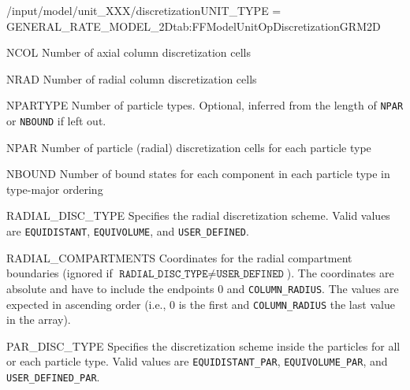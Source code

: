 \begin{condsubgroup}{/input/model/unit\_XXX/discretization}{UNIT\_TYPE = GENERAL\_RATE\_MODEL\_2D}{tab:FFModelUnitOpDiscretizationGRM2D}
  \begin{dataset}[type=int,range={$\geq 1$},length=1]{NCOL}
    Number of axial column discretization cells
  \end{dataset}
  \begin{dataset}[type=int,range={$\geq 1$},length=1]{NRAD}
    Number of radial column discretization cells
  \end{dataset}
  \begin{dataset}[type=int,range={$\geq 1$},length=1]{NPARTYPE}
    Number of particle types.
    Optional, inferred from the length of \texttt{NPAR} or \texttt{NBOUND} if left out.
  \end{dataset}
  \begin{dataset}[type=int,range={$\geq 1$},length={$1$ / \texttt{NPARTYPE}}]{NPAR}
    Number of particle (radial) discretization cells for each particle type
  \end{dataset}
  \begin{dataset}[type=int,range={$\geq 0$},length={\texttt{NCOMP} / $\texttt{NPARTYPE} \cdot \texttt{NCOMP}$}]{NBOUND}
    Number of bound states for each component in each particle type in type-major ordering
  \end{dataset}
  \begin{dataset}[type=string,length=1]{RADIAL\_DISC\_TYPE}
    Specifies the radial discretization scheme.
    Valid values are \texttt{EQUIDISTANT}, \texttt{EQUIVOLUME}, and \texttt{USER\_DEFINED}.
  \end{dataset}
  \begin{dataset}[unit=\si{\metre},type=double,range={$[0,\texttt{COLUMN\_RADIUS}]$},length={$\texttt{NRAD} + 1$}]{RADIAL\_COMPARTMENTS}
    Coordinates for the radial compartment boundaries (ignored if $\texttt{RADIAL\_DISC\_TYPE} \neq \texttt{USER\_DEFINED}$).
    The coordinates are absolute and have to include the endpoints $0$ and \texttt{COLUMN\_RADIUS}.
    The values are expected in ascending order (i.e., $0$ is the first and \texttt{COLUMN\_RADIUS} the last value in the array).
  \end{dataset}
  \begin{dataset}[type=string,length={$1$ / \texttt{NPARTYPE}}]{PAR\_DISC\_TYPE}
    Specifies the discretization scheme inside the particles for all or each particle type.
    Valid values are \texttt{EQUIDISTANT\_PAR}, \texttt{EQUIVOLUME\_PAR}, and \texttt{USER\_DEFINED\_PAR}.

\end{dataset}
\end{condsubgroup}
